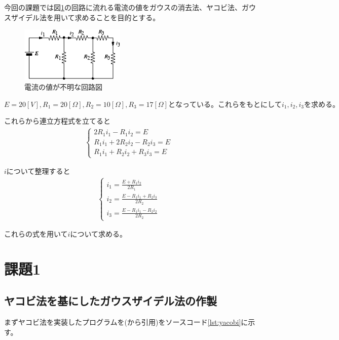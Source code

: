 \documentclass[12pt]{jsarticle}
\begin{document}
今回の課題では図\ref{fig:kairo}の回路に流れる電流の値をガウスの消去法、ヤコビ法、ガウスザイデル法を用いて求めることを目的とする。
\begin{figure}[h]
	\centering
	\includegraphics[clip,width=5.0cm]{./kairo.png}
	\caption{電流の値が不明な回路図}
	\label{fig:kairo}
\end{figure}

$E = 20[V], R_1 = 20[\Omega], R_2= 10[\Omega], R_3 = 17[\Omega] となっている。これらをもとにしてi_1, i_2, i_3 を求める。$

これらから連立方程式を立てると
\begin{eqnarray}
	\begin{cases}
		2R_1i_1 - R_1i_2 = E & \\
		R_1i_1 + 2R_2i_2 - R_2i_3 = E & \\
		R_1i_1 + R_2i_2 + R_3i_3 = E
	\end{cases}
\end{eqnarray}

$i$について整理すると
\begin{eqnarray}
	\begin{cases}
		i_1 = \frac{E + R_1i_2}{2R_1} &\\
		i_2 = \frac{E -R_1i_1 + R_2i_3}{2R_2} &\\
		i_3 = \frac{E -R_1i_1 - R_2i_2}{2R_2}
	\end{cases}
\end{eqnarray}

これらの式を用いて$i$について求める。

\section{課題1}
\subsection{ヤコビ法を基にしたガウスザイデル法の作製}
まずヤコビ法を実装したプログラムを(\cite{yacobiurl}から引用)をソースコード\ref{lst:yacobi}に示す。
\end{document}
